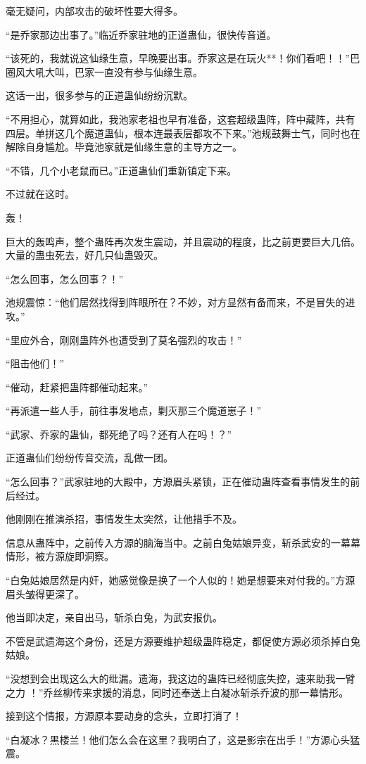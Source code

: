 \begin{this_body}
毫无疑问，内部攻击的破坏性要大得多。

“是乔家那边出事了。”临近乔家驻地的正道蛊仙，很快传音道。

“该死的，我就说这仙缘生意，早晚要出事。乔家这是在玩火**！你们看吧！！”巴圈风大吼大叫，巴家一直没有参与仙缘生意。

这话一出，很多参与的正道蛊仙纷纷沉默。

“不用担心，就算如此，我池家老祖也早有准备，这套超级蛊阵，阵中藏阵，共有四层。单拼这几个魔道蛊仙，根本连最表层都攻不下来。”池规鼓舞士气，同时也在解除自身尴尬。毕竟池家就是仙缘生意的主导方之一。

“不错，几个小老鼠而已。”正道蛊仙们重新镇定下来。

不过就在这时。

轰！

巨大的轰鸣声，整个蛊阵再次发生震动，并且震动的程度，比之前更要巨大几倍。大量的蛊虫死去，好几只仙蛊毁灭。

“怎么回事，怎么回事？！”

池规震惊：“他们居然找得到阵眼所在？不妙，对方显然有备而来，不是冒失的进攻。”

“里应外合，刚刚蛊阵外也遭受到了莫名强烈的攻击！”

“阻击他们！”

“催动，赶紧把蛊阵都催动起来。”

“再派遣一些人手，前往事发地点，剿灭那三个魔道崽子！”

“武家、乔家的蛊仙，都死绝了吗？还有人在吗！？”

正道蛊仙们纷纷传音交流，乱做一团。

“怎么回事？”武家驻地的大殿中，方源眉头紧锁，正在催动蛊阵查看事情发生的前后经过。

他刚刚在推演杀招，事情发生太突然，让他措手不及。

信息从蛊阵中，之前传入方源的脑海当中。之前白兔姑娘异变，斩杀武安的一幕幕情形，被方源旋即洞察。

“白兔姑娘居然是内奸，她感觉像是换了一个人似的！她是想要来对付我的。”方源眉头皱得更深了。

他当即决定，亲自出马，斩杀白兔，为武安报仇。

不管是武遗海这个身份，还是方源要维护超级蛊阵稳定，都促使方源必须杀掉白兔姑娘。

“没想到会出现这么大的纰漏。遗海，我这边的蛊阵已经彻底失控，速来助我一臂之力 ！”乔丝柳传来求援的消息，同时还奉送上白凝冰斩杀乔波的那一幕情形。

接到这个情报，方源原本要动身的念头，立即打消了！

“白凝冰？黑楼兰！他们怎么会在这里？我明白了，这是影宗在出手！”方源心头猛震。


\end{this_body}

